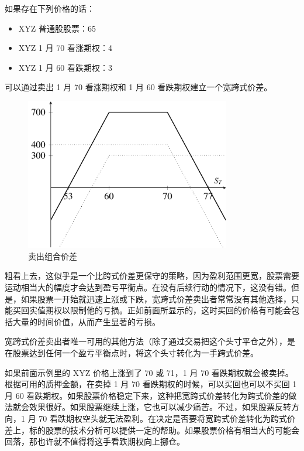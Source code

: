 \begin{tcolorbox}
    如果存在下列价格的话：
    \begin{itemize}
        \item XYZ 普通股股票：65
        \item XYZ 1 月 70 看涨期权：4
        \item XYZ 1 月 60 看跌期权：3
    \end{itemize}
    可以通过卖出 1 月 70 看涨期权和 1 月 60 看跌期权建立一个宽跨式价差。
\end{tcolorbox}
\begin{figure}
    \begin{center}
        \includegraphics[width=0.8\textwidth]{IMG/fig20-3.pdf}
        \caption{卖出组合价差}
    \end{center}
\end{figure}

粗看上去，这似乎是一个比跨式价差更保守的策略，因为盈利范围更宽，股票需要运动相当大的幅度才会达到盈亏平衡点。在没有后续行动的情况下，这没有错。但是，如果股票一开始就迅速上涨或下跌，宽跨式价差卖出者常常没有其他选择，只能买回实值期权以限制他的亏损。正如前面所显示的，这时买回的价格有可能会包括大量的时间价值，从而产生显著的亏损。

宽跨式价差卖出者唯一可用的其他方法（除了通过交易把这个头寸平仓之外），是在股票达到任何一个盈亏平衡点时，将这个头寸转化为一手跨式价差。

如果前面示例里的 XYZ 价格上涨到了 70 或 71，1 月 70 看跌期权就会被卖掉。根据可用的质押金额，在卖掉 1 月 70 看跌期权的时候，可以买回也可以不买回 1 月 60 看跌期权。如果股票价格稳定下来，这种把宽跨式价差转化为跨式价差的做法就会效果很好。如果股票继续上涨，它也可以减少痛苦。不过，如果股票反转方向，1 月 70 看跌期权空头就无法盈利。在决定是否要将宽跨式价差转化为跨式价差上，标的股票的技术分析可以提供一定的帮助。如果股票价格有相当大的可能会回落，那也许就不值得将这手看跌期权向上挪仓。


